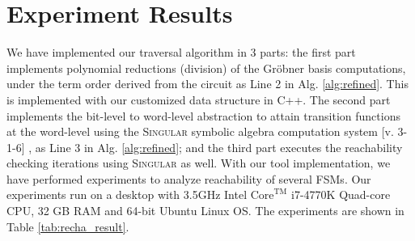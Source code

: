 \begin{Example}
\begin{figure}[H]
\end{figure}

\end{Example}

\section{Experiment Results}
\label{sec:exp_reacha}
We have implemented our traversal algorithm in 3 parts:
the first part implements polynomial reductions (division) of the
Gr\"obner basis computations, under the term order derived from the
circuit as Line 2 in Alg. \ref{alg:refined}. This is implemented 
with our customized data structure in
C++. The second part implements the bit-level to word-level
abstraction to attain transition functions at the word-level 
using the \textsc{Singular} symbolic
algebra computation system [v. 3-1-6] \cite{DGPS}, as Line 3 in 
Alg. \ref{alg:refined}; and the third part
executes the reachability checking iterations using 
\textsc{Singular} as well. With our
tool implementation, we have performed experiments to analyze reachability
of several FSMs. Our experiments run on a desktop with
3.5GHz Intel $\text{Core}^\text{TM}$ i7-4770K Quad-core CPU, 32 GB RAM and
64-bit Ubuntu Linux OS. The experiments are shown in Table \ref{tab:recha_result}. 

